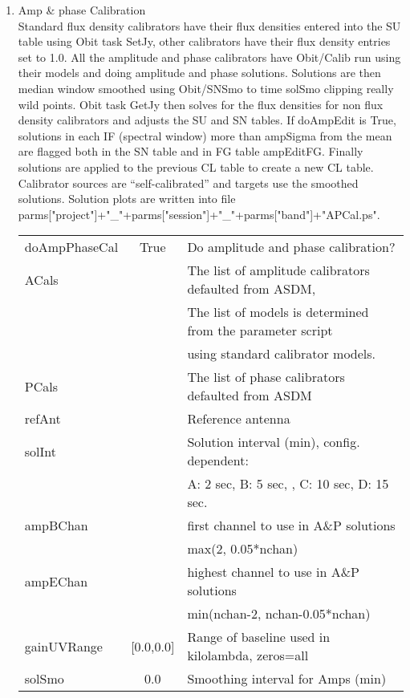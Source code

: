 \documentclass[11pt]{article}
\begin{document}
\begin{enumerate}
\begin{center}
\begin{tabular}{|l|c|l|}
\hline
\end{tabular}
\end{center}
\newpage
%
\item Amp \& phase Calibration \\
Standard flux density calibrators have their flux densities entered
into the SU table using Obit task SetJy, other calibrators have their
flux density entries set to 1.0.
All the amplitude and phase calibrators have Obit/Calib run using
their models and doing amplitude and phase solutions.
Solutions are then median window smoothed using Obit/SNSmo to time
solSmo clipping really wild points.
Obit task GetJy then solves for the flux densities for non flux
density calibrators and adjusts the SU and SN tables. If doAmpEdit is
True, solutions in each IF (spectral window) more than ampSigma from
the mean are flagged both in the SN table and in FG table ampEditFG.
Finally solutions are applied to the previous CL table to create a new
CL table.
Calibrator sources are ``self-calibrated'' and targets use the
smoothed solutions. 
Solution plots are written into file\\
parms["project"]+"\_"+parms["session"]+"\_"+parms["band"]+"APCal.ps".
\begin{center}
\begin{tabular}{|l|c|l|}
\hline
doAmpPhaseCal  & True & Do amplitude and phase calibration? \\
ACals  &  & The list of amplitude calibrators defaulted from ASDM, \\
  &  & The list of models is determined from the parameter script \\
  & & using standard calibrator models. \\
PCals  &  &  The list of phase calibrators defaulted from ASDM\\
refAnt  &  & Reference antenna \\
solInt  &  &  Solution interval (min), config. dependent:\\
  &  & A: 2 sec, B: 5 sec, , C:  10 sec, D: 15 sec.\\
ampBChan  &  & first channel to use in A\&P solutions \\
  &  &   max(2, 0.05*nchan)\\
ampEChan  &  &  highest channel to use in A\&P solutions\\
  &  &  min(nchan-2, nchan-0.05*nchan)\\
gainUVRange & [0.0,0.0] & Range of baseline used in kilolambda, zeros=all\\
solSmo  & 0.0 &  Smoothing interval for Amps (min)\\

\end{tabular}
\end{center}
\end{enumerate}
\end{document}
